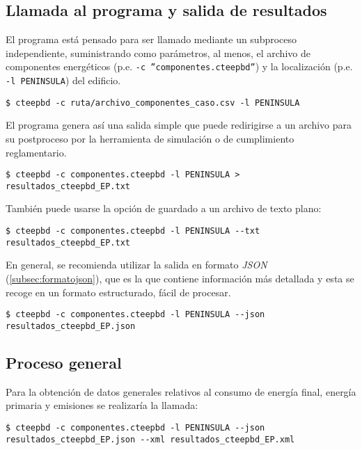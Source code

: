 \documentclass[10pt,notitlepage,oneside,a4paper]{article}
\begin{document}
\subsection{Llamada al programa y salida de resultados}

El programa está pensado para ser llamado mediante un subproceso independiente, suministrando como parámetros, al menos, el archivo de componentes energéticos (p.e. \texttt{-c ''componentes.cteepbd''}) y la localización (p.e. \texttt{-l PENINSULA}) del edificio.

\begin{Verbatim}[fontsize=\small]
    $ cteepbd -c ruta/archivo_componentes_caso.csv -l PENINSULA
\end{Verbatim}

El programa genera así una salida simple que puede redirigirse a un archivo para su postproceso por la herramienta de simulación o de cumplimiento reglamentario.

\begin{Verbatim}[fontsize=\small]
    $ cteepbd -c componentes.cteepbd -l PENINSULA > resultados_cteepbd_EP.txt
\end{Verbatim}

También puede usarse la opción de guardado a un archivo de texto plano:

\begin{Verbatim}[fontsize=\small]
    $ cteepbd -c componentes.cteepbd -l PENINSULA --txt resultados_cteepbd_EP.txt
\end{Verbatim}

En general, se recomienda utilizar la salida en formato \textit{JSON} (\autoref{subsec:formatojson}), que es la que contiene información más detallada y esta se recoge en un formato estructurado, fácil de procesar.

\begin{Verbatim}[fontsize=\small]
    $ cteepbd -c componentes.cteepbd -l PENINSULA --json resultados_cteepbd_EP.json
\end{Verbatim}

\subsection{Proceso general}

Para la obtención de datos generales relativos al consumo de energía final, energía primaria y emisiones se realizaría la llamada:

\begin{Verbatim}[fontsize=\small]
    $ cteepbd -c componentes.cteepbd -l PENINSULA --json resultados_cteepbd_EP.json --xml resultados_cteepbd_EP.xml
\end{Verbatim}
\end{document}
